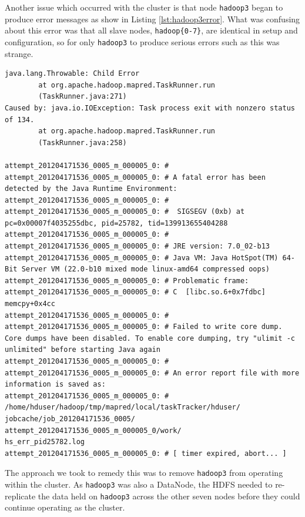 Another issue which occurred with the cluster is that node {\tt hadoop3} began to produce error messages as show in Listing \ref{lst:hadoop3error}. What was confusing about this error was that all slave nodes, {\tt hadoop\{0-7\}}, are identical in setup and configuration, so for only {\tt hadoop3} to produce serious errors such as this was strange.

\begin{lstlisting}[float]
java.lang.Throwable: Child Error
        at org.apache.hadoop.mapred.TaskRunner.run
        (TaskRunner.java:271)
Caused by: java.io.IOException: Task process exit with nonzero status of 134.
        at org.apache.hadoop.mapred.TaskRunner.run
        (TaskRunner.java:258)

attempt_201204171536_0005_m_000005_0: #
attempt_201204171536_0005_m_000005_0: # A fatal error has been detected by the Java Runtime Environment:
attempt_201204171536_0005_m_000005_0: #
attempt_201204171536_0005_m_000005_0: #  SIGSEGV (0xb) at pc=0x00007f4035255dbc, pid=25782, tid=139913655404288
attempt_201204171536_0005_m_000005_0: #
attempt_201204171536_0005_m_000005_0: # JRE version: 7.0_02-b13
attempt_201204171536_0005_m_000005_0: # Java VM: Java HotSpot(TM) 64-Bit Server VM (22.0-b10 mixed mode linux-amd64 compressed oops)
attempt_201204171536_0005_m_000005_0: # Problematic frame:
attempt_201204171536_0005_m_000005_0: # C  [libc.so.6+0x7fdbc]  memcpy+0x4cc
attempt_201204171536_0005_m_000005_0: #
attempt_201204171536_0005_m_000005_0: # Failed to write core dump. Core dumps have been disabled. To enable core dumping, try "ulimit -c unlimited" before starting Java again
attempt_201204171536_0005_m_000005_0: #
attempt_201204171536_0005_m_000005_0: # An error report file with more information is saved as:
attempt_201204171536_0005_m_000005_0: # /home/hduser/hadoop/tmp/mapred/local/taskTracker/hduser/
jobcache/job_201204171536_0005/
attempt_201204171536_0005_m_000005_0/work/
hs_err_pid25782.log
attempt_201204171536_0005_m_000005_0: # [ timer expired, abort... ]
\end{lstlisting}

The approach we took to remedy this was to remove {\tt hadoop3} from operating within the cluster. As {\tt hadoop3} was also a DataNode, the HDFS needed to re-replicate the data held on {\tt hadoop3} across the other seven nodes before they could continue operating as the cluster.